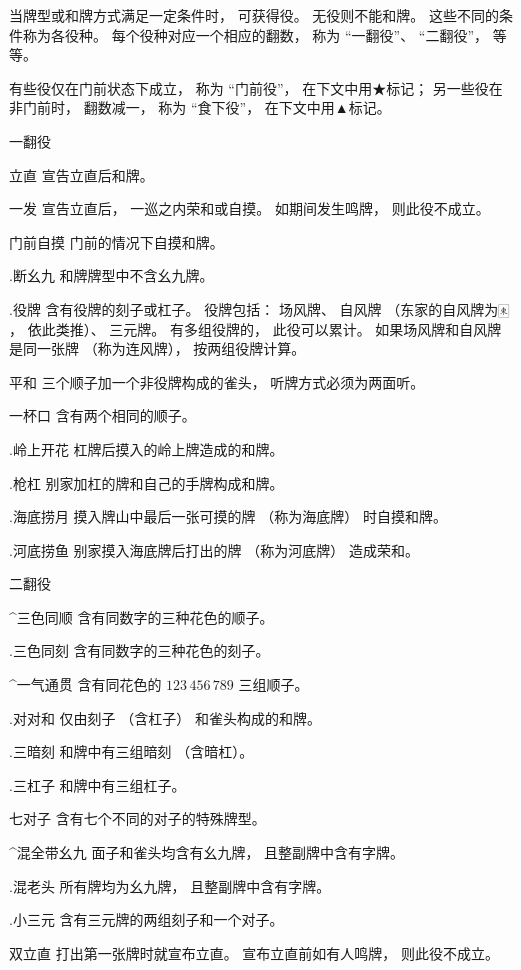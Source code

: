 当牌型或和牌方式满足一定条件时， 可获得役。 无役则不能和牌。
这些不同的条件称为各役种。 每个役种对应一个相应的翻数， 称为
“一翻役”、 “二翻役”， 等等。

有些役仅在门前状态下成立， 称为 “门前役”， 在下文中用★标记；
另一些役在非门前时， 翻数减一， 称为 “食下役”， 在下文中用▲标记。

 一翻役

\yaku*立直
宣告立直后和牌。

\yaku*一发
宣告立直后， 一巡之内荣和或自摸。 如期间发生鸣牌， 则此役不成立。

\yaku*门前自摸
门前的情况下自摸和牌。

\yaku.断幺九
和牌牌型中不含幺九牌。

\yaku.役牌
含有役牌的刻子或杠子。 役牌包括： 场风牌、
自风牌 （东家的自风牌为$🀀$， 依此类推）、 三元牌。
有多组役牌的， 此役可以累计。
如果场风牌和自风牌是同一张牌 （称为连风牌）， 按两组役牌计算。

\yaku*平和
三个顺子加一个非役牌构成的雀头， 听牌方式必须为两面听。

\yaku*一杯口
含有两个相同的顺子。

\yaku.岭上开花
杠牌后摸入的岭上牌造成的和牌。

\yaku.枪杠
别家加杠的牌和自己的手牌构成和牌。

\yaku.海底捞月
摸入牌山中最后一张可摸的牌 （称为海底牌） 时自摸和牌。

\yaku.河底捞鱼
别家摸入海底牌后打出的牌 （称为河底牌） 造成荣和。

 二翻役

\yaku^三色同顺
含有同数字的三种花色的顺子。

\yaku.三色同刻
含有同数字的三种花色的刻子。

\yaku^一气通贯
含有同花色的 $123\,456\,789$ 三组顺子。

\yaku.对对和
仅由刻子 （含杠子） 和雀头构成的和牌。

\yaku.三暗刻
和牌中有三组暗刻 （含暗杠）。

\yaku.三杠子
和牌中有三组杠子。

\yaku*七对子
含有七个不同的对子的特殊牌型。

\yaku^混全带幺九
面子和雀头均含有幺九牌， 且整副牌中含有字牌。

\yaku.混老头
所有牌均为幺九牌， 且整副牌中含有字牌。

\yaku.小三元
含有三元牌的两组刻子和一个对子。

\yaku*双立直
打出第一张牌时就宣布立直。 宣布立直前如有人鸣牌， 则此役不成立。

